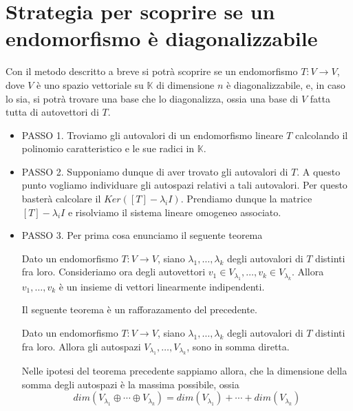 \section{Strategia per scoprire se un endomorfismo \`e diagonalizzabile}
Con il metodo descritto a breve si potr\`a scoprire se un endomorfismo
$T : V \to V$, dove $V$ \`e uno spazio vettoriale su $\mathbb{K}$ di dimensione $n$
\`e diagonalizzabile, e, in caso lo sia, si potr\`a trovare una base che lo diagonalizza,
ossia una base di $V$ fatta tutta di autovettori di $T$.

\begin{itemize}
	\item PASSO 1. Troviamo gli autovalori di un endomorfismo lineare $T$ calcolando il polinomio
	      caratteristico e le sue radici in $\mathbb{K}$.
	\item PASSO 2. Supponiamo dunque di aver trovato gli autovalori di $T$. A questo punto
	      vogliamo individuare gli autospazi relativi a tali autovalori.
	      Per questo baster\`a calcolare il $Ker([T] - \lambda_i I)$. Prendiamo dunque la
	      matrice $[T] - \lambda_i I$ e risolviamo il sistema lineare omogeneo associato.
	\item PASSO 3. Per prima cosa enunciamo il seguente teorema
	      \begin{theorem}
		      Dato un endomorfismo $T : V \to V$, siano $\lambda_1, \dots, \lambda_k$
		      degli autovalori di $T$ distinti fra loro. Consideriamo ora degli autovettori
		      $v_1 \in V_{\lambda_1}, \dots, v_k \in V_{\lambda_k}$. Allora
		      $v_1, \dots, v_k$ \`e un insieme di vettori linearmente indipendenti.
	      \end{theorem}

	      Il seguente teorema \`e un rafforazamento del precedente.
	      \begin{theorem}
		      Dato un endomorfismo $T : V \to V$, siano $\lambda_1, \dots, \lambda_k$ degli
		      autovalori di $T$ distinti fra loro. Allora gli autospazi
		      $V_{\lambda_1}, \dots, V_{\lambda_k}$, sono in somma diretta.
	      \end{theorem}

	      Nelle ipotesi del teorema precedente sappiamo allora, che la dimensione della somma
	      degli autospazi \`e la massima possibile, ossia
	      \begin{equation*}
		      dim(V_{\lambda_1} \oplus \cdots \oplus V_{\lambda_k}) = dim(V_{\lambda_1}) +
		      \cdots + dim(V_{\lambda_k})
	      \end{equation*}


\end{itemize}
